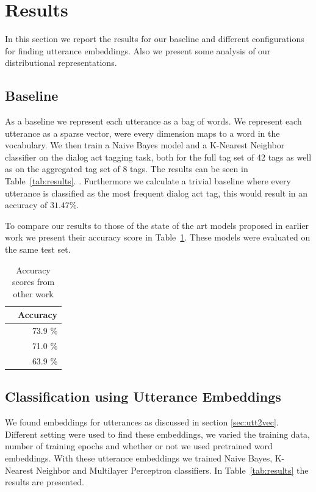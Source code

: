 \section{Results}\label{sec:results}
In this section we report the results for our baseline and different configurations for finding utterance embeddings.
Also we present some analysis of our distributional representations.

\subsection{Baseline}
As a baseline we represent each utterance as a bag of words.
We represent each utterance as a sparse vector, were every dimension maps to a word in the vocabulary.
We then train a Naive Bayes model and a K-Nearest Neighbor classifier on the dialog act tagging task, both for the full tag set of 42 tags as well as on the aggregated tag set of 8 tags.
The results can be seen in Table~\ref{tab:results}. .
Furthermore we calculate a trivial baseline where every utterance is classified as the most frequent dialog act tag, this would result in an accuracy of $31.47\%$.

To compare our results to those of the state of the art models proposed in earlier work we present their accuracy score in Table~\ref{tab:sota}. These models were evaluated on the same test set.
\begin{table}[t]
	\centering
	\begin{tabular}{l|r}
		& \textbf{Accuracy} \\ \hline
		\newcite{kalchbrenner} & 73.9 \%           \\
		\newcite{stolcke2000}  & 71.0 \%           \\
		\newcite{milajevs}     & 63.9 \%          
	\end{tabular}
		\caption{Accuracy scores from other work}
		\label{tab:sota}
\end{table}

\subsection{Classification using Utterance Embeddings}
We found embeddings for utterances as discussed in section \ref{sec:utt2vec}.
Different setting were used to find these embeddings, we varied the training data, number of training epochs and whether or not we used pretrained word embeddings.
With these utterance embeddings we trained Naive Bayes, K-Nearest Neighbor and Multilayer Perceptron classifiers.
In Table~\ref{tab:results} the results are presented. 

